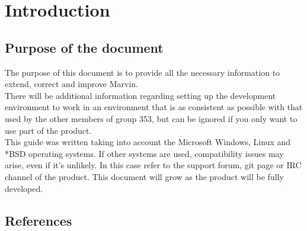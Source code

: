 \documentclass[ManualeSviluppatore]{subfiles}
\begin{document}
\chapter{Introduction}

	\section{Purpose of the document}
	The purpose of this document is to provide all the necessary information to extend, correct and improve Marvin. \\
	There will be additional information regarding setting up the development environment to work in an environment that is as consistent as possible with that used by the other members of group 353, but can be ignored if you only want to use part of the product. \\
	This guide was written taking into account the Microsoft Windows, Linux and *BSD operating systems. If other systems are used, compatibility issues may arise, even if it's unlikely. In this case refer to the support forum, git page or IRC channel of the product.
	This document will grow as the product will be fully developed.
	
	\scopoProdottoEN
	
	\section{References}
\end{document}
